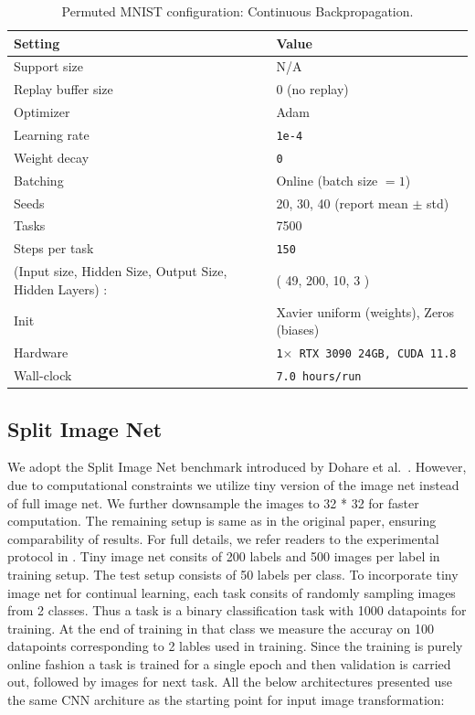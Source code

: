 \documentclass{article}
\begin{document}
\begin{table}[H]
\centering
\footnotesize
\caption{Permuted MNIST configuration: Continuous Backpropagation.}
\label{tab:pmnist_bp}
\begin{tabular}{@{}ll@{}}
\toprule
Setting & Value \\ \midrule
Support size & N/A \\
Replay buffer size & 0 (no replay) \\
Optimizer & Adam  \\
Learning rate & \texttt{1e-4} \\
Weight decay & \texttt{0} \\
Batching & Online (batch size $=1$) \\
Seeds & 20, 30, 40 (report mean $\pm$ std) \\
Tasks & 7500 \\
Steps per task & \texttt{150} \\
(Input size, Hidden Size, Output Size, Hidden Layers) : & ( 49, 200, 10, 3 ) \\ 
Init &  Xavier uniform (weights), Zeros (biases)\\
Hardware & \texttt{1$\times$ RTX 3090 24GB, CUDA 11.8} \\
Wall-clock & \texttt{7.0 hours/run} \\
\bottomrule
\end{tabular}
\end{table}

\clearpage
\subsection{Split Image Net}
\label{sec:split_image_net_setup}
We adopt the Split Image Net benchmark introduced by Dohare et al.~\citep{dohare2024loss}. However, due to computational constraints we utilize 
tiny version of the image net instead of full image net. We further downsample the images to 32 * 32 for faster computation.
The remaining setup is same as in the original paper, ensuring comparability of results.  
For full details, we refer readers to the experimental protocol in \citep{dohare2024loss}.
Tiny image net consits of 200 labels and 500 images per label in training setup.
The test setup consists of 50 labels per class. 
To incorporate tiny image net for continual learning, each task consits of randomly sampling images from 2 classes. Thus a task is a binary classification task with 1000 datapoints for training. At the end of training in that class we measure the accuray on 100 datapoints corresponding to 2 lables used in training.
Since the training is purely online fashion a task is trained for a single epoch and then validation is carried out, followed by images for next task.
All the below architectures presented use the same CNN architure as the starting point for input image transformation:
\end{document}
